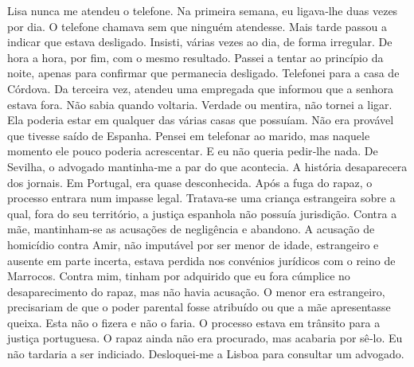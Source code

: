 Lisa nunca me atendeu o telefone. Na primeira semana, eu ligava­‑lhe
duas vezes por dia. O telefone chamava sem que ninguém atendesse. Mais
tarde passou a indicar que estava desligado. Insisti, várias vezes ao
dia, de forma irregular. De hora a hora, por fim, com o mesmo resultado.
Passei a tentar ao princípio da noite, apenas para confirmar que
permanecia desligado. Telefonei para a casa de Córdova. Da terceira vez,
atendeu uma empregada que informou que a senhora estava fora. Não sabia
quando voltaria. Verdade ou mentira, não tornei a ligar. Ela poderia
estar em qualquer das várias casas que possuíam. Não era provável que
tivesse saído de Espanha. Pensei em telefonar ao marido, mas naquele
momento ele pouco poderia acrescentar. E eu não queria pedir­‑lhe nada.
De Sevilha, o advogado mantinha­‑me a par do que acontecia. A história
desaparecera dos jornais. Em Portugal, era quase desconhecida. Após a
fuga do rapaz, o processo entrara num impasse legal. Tratava­‑se uma
criança estrangeira sobre a qual, fora do seu território, a justiça
espanhola não possuía jurisdição. Contra a mãe, mantinham­‑se as
acusações de negligência e abandono. A acusação de homicídio contra
Amir, não imputável por ser menor de idade, estrangeiro e ausente em
parte incerta, estava perdida nos convénios jurídicos com o reino de
Marrocos. Contra mim, tinham por adquirido que eu fora cúmplice no
desaparecimento do rapaz, mas não havia acusação. O menor era
estrangeiro, precisariam de que o poder parental fosse atribuído ou que
a mãe apresentasse queixa. Esta não o fizera e não o faria. O processo
estava em trânsito para a justiça portuguesa. O rapaz ainda não era
procurado, mas acabaria por sê­‑lo. Eu não tardaria a ser indiciado.
Desloquei­‑me a Lisboa para consultar um advogado.

